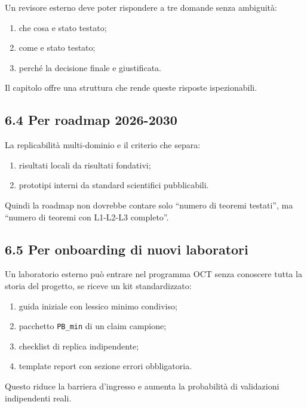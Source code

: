 Un revisore esterno deve poter rispondere a tre domande senza ambiguità:

\begin{enumerate}
\def\labelenumi{\arabic{enumi}.}
\tightlist
\item
  che cosa e stato testato;
\item
  come e stato testato;
\item
  perché la decisione finale e giustificata.
\end{enumerate}

Il capitolo offre una struttura che rende queste risposte ispezionabili.

\subsection{6.4 Per roadmap 2026-2030}

La replicabilità multi-dominio e il criterio che separa:

\begin{enumerate}
\def\labelenumi{\arabic{enumi}.}
\tightlist
\item
  risultati locali da risultati fondativi;
\item
  prototipi interni da standard scientifici pubblicabili.
\end{enumerate}

Quindi la roadmap non dovrebbe contare solo ``numero di teoremi testati'', ma ``numero di teoremi con L1-L2-L3 completo''.

\subsection{6.5 Per onboarding di nuovi laboratori}

Un laboratorio esterno può entrare nel programma OCT senza conoscere tutta la storia del progetto, se riceve un kit standardizzato:

\begin{enumerate}
\def\labelenumi{\arabic{enumi}.}
\tightlist
\item
  guida iniziale con lessico minimo condiviso;
\item
  pacchetto \texttt{PB\_min} di un claim campione;
\item
  checklist di replica indipendente;
\item
  template report con sezione errori obbligatoria.
\end{enumerate}

Questo riduce la barriera d'ingresso e aumenta la probabilità di validazioni indipendenti reali.

